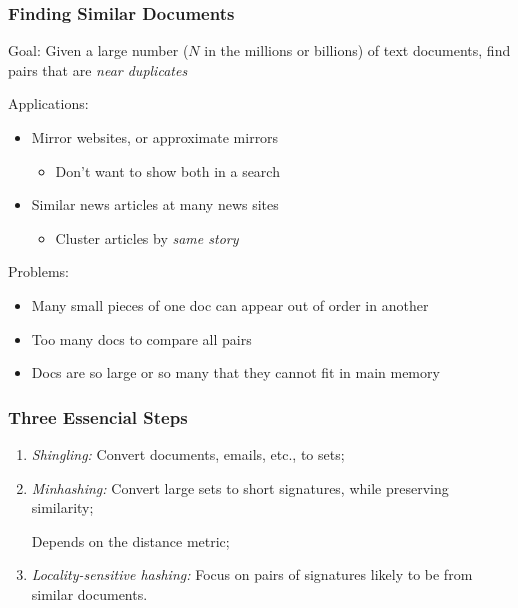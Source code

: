\documentclass[svgnames]{beamer}
\begin{document}
\begin{frame} \frametitle{Finding Similar Documents}

\begin{block}{Goal:}
Given a large number ($N$ in the millions or billions) of text documents, find pairs that are \emph{near duplicates}
\end{block}

\begin{block}{Applications:}
  \begin{itemize}
  \item Mirror websites, or approximate mirrors
    \begin{itemize}
    \item Don’t want to show both in a search
    \end{itemize}
  \item Similar news articles at many news sites
    \begin{itemize}
    \item Cluster articles by \emph{same story}
    \end{itemize}
  \end{itemize}
\end{block}
\begin{block}{Problems:}
  \begin{itemize}
  \item Many small pieces of one doc can appear out of order in another
  \item Too many docs to compare all pairs
  \item Docs are so large or so many that they cannot fit in main memory
  \end{itemize}
\end{block}
\end{frame}

  
\begin{frame} \frametitle{Three Essencial Steps}

\begin{enumerate}
\item \emph{Shingling:} Convert documents, emails, etc., to sets;

\item \emph{Minhashing:} Convert large sets to short signatures, while preserving similarity;
   \begin{itemize}
   Depends on the distance metric;
   \end{itemize}
\item \emph{Locality-sensitive hashing:} Focus on pairs of signatures likely to be from similar documents.
\end{enumerate}

\end{frame}
\end{document}
